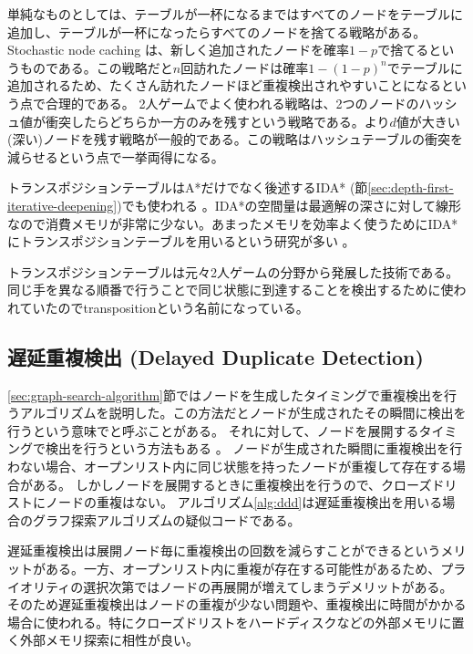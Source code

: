 単純なものとしては、テーブルが一杯になるまではすべてのノードをテーブルに追加し、テーブルが一杯になったらすべてのノードを捨てる戦略がある。
Stochastic node caching \cite{miura1999stochastic}は、新しく追加されたノードを確率$1-p$で捨てるというものである。この戦略だと$n$回訪れたノードは確率$1- (1-p)^n$でテーブルに追加されるため、たくさん訪れたノードほど重複検出されやすいことになるという点で合理的である。
2人ゲームでよく使われる戦略は、2つのノードのハッシュ値が衝突したらどちらか一方のみを残すという戦略である。より$d$値が大きい(深い)ノードを残す戦略が一般的である。この戦略はハッシュテーブルの衝突を減らせるという点で一挙両得になる。

トランスポジションテーブルはA*だけでなく後述するIDA* (節\ref{sec:depth-first-iterative-deepening})でも使われる \cite{reinefeld1994enhanced}。IDA*の空間量は最適解の深さに対して線形なので消費メモリが非常に少ない。あまったメモリを効率よく使うためにIDA*にトランスポジションテーブルを用いるという研究が多い \cite{reinefeld1994enhanced,akagi2010transposition,kishimoto:02}。

トランスポジションテーブルは元々2人ゲームの分野から発展した技術である。同じ手を異なる順番で行うことで同じ状態に到達することを検出するために使われていたのでtranspositionという名前になっている。


\subsection{遅延重複検出 (Delayed Duplicate Detection)}
\label{sec:delayed-duplicate-detection}

\ref{sec:graph-search-algorithm}節ではノードを生成したタイミングで重複検出を行うアルゴリズムを説明した。この方法だとノードが生成されたその瞬間に検出を行うという意味でと呼ぶことがある。
それに対して、ノードを展開するタイミングで検出を行うという方法もある \cite{korf2003delayed}。
ノードが生成された瞬間に重複検出を行わない場合、オープンリスト内に同じ状態を持ったノードが重複して存在する場合がある。
しかしノードを展開するときに重複検出を行うので、クローズドリストにノードの重複はない。
アルゴリズム\ref{alg:ddd}は遅延重複検出を用いる場合のグラフ探索アルゴリズムの疑似コードである。

遅延重複検出は展開ノード毎に重複検出の回数を減らすことができるというメリットがある。一方、オープンリスト内に重複が存在する可能性があるため、プライオリティの選択次第ではノードの再展開が増えてしまうデメリットがある。
そのため遅延重複検出はノードの重複が少ない問題や、重複検出に時間がかかる場合に使われる。特にクローズドリストをハードディスクなどの外部メモリに置く外部メモリ探索に相性が良い。


